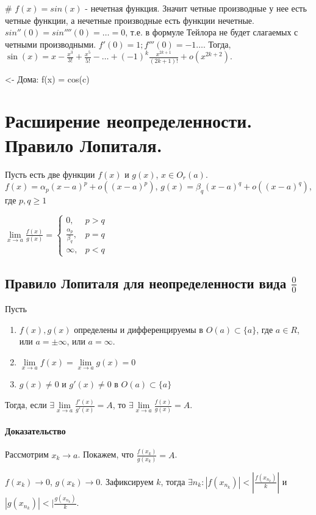 \documentclass[10pt]{article}
\newcommand{\limx}[1]{\lim\limits_{x \to #1}}
\begin{document}
		\# $f(x) = sin(x)$ - нечетная функция. Значит четные производные у нее есть четные функции, а нечетные производные есть функции нечетные. $sin''(0) = sin''''(0) = \dots = 0$, т.е. в формуле Тейлора не будет слагаемых с четными производными. $f'(0) = 1; f'''(0) = -1 \dots$. Тогда, $\sin(x) = x - \frac{x^3}{3!} + \frac{x^5}{5!} - \dots + (-1)^{k}\frac{x^{2k+1}}{(2k + 1)!} + o(x^{2k+2})$.
		
		<- Дома: f(x) = cos(c)
		
	\section{Расширение неопределенности. Правило Лопиталя.}
	Пусть есть две функции $f(x)$ и $g(x)$, $x \in O_r(a)$. 
	$f(x) =  \alpha_p(x-a)^p + o((x-a)^p)$, $g(x) = \beta_q(x-a)^q + o((x-a)^q)$, где $p,q \geq 1$
	
	$\limx{a} \frac{f(x)}{g(x)} = 
	\begin{cases}
		0,& p > q\\
		\frac{\alpha_p}{\beta_q},& p=q\\
		\infty,& p<q
	\end{cases}$
	
	\subsection{Правило Лопиталя для неопределенности вида $\frac{0}{0}$}
	Пусть 
	\begin{enumerate}
		\item $f(x), g(x)$ определены и дифференцируемы в $O(a)\subset\{a\}$, где $a \in R$, или $a = \pm \infty$, или $a = \infty$.
		\item $\limx{a} f(x) = \limx{a} g(x) = 0$
		\item $g(x) \neq 0$ и $g'(x) \neq 0$ в $O(a)\subset\{a\}$
	\end{enumerate}
	Тогда, если $\exists \limx{a} \frac{f'(x)}{g'(x)} = A$, то $\exists \limx{a} \frac{f(x)}{g(x)} = A$.
	
	\paragraph{Доказательство}
	Рассмотрим $x_k \to a$. Покажем, что $\frac{f(x_k)}{g(x_k)} = A$.
	
	$f(x_k) \to 0$, $g(x_k) \to 0$. Зафиксируем $k$, тогда $\exists n_k : |f(x_{n_k})| < |\frac{f(x_{n_k})}{k}|$ и $|g(x_{n_k})| < |\frac{g(x_{n_k})}{k}$.
\end{document}
